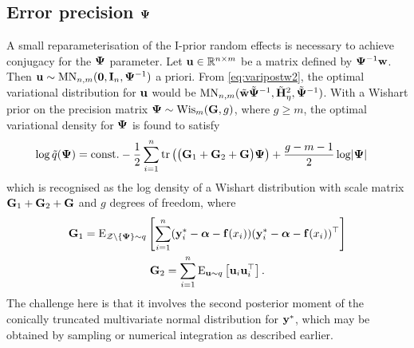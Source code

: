 
\subsection[Error precision Psi]{Error precision ${\bm\Psi}$}

A small reparameterisation of the I-prior random effects is necessary to achieve conjugacy for the ${\bm\Psi}$ parameter. 
Let ${\mathbf u}\in\mathbb{R}^{n\times m}$ be a matrix defined by ${\bm\Psi}^{-1}{\mathbf w}$.
Then ${\mathbf u} \sim \operatorname{MN}_{n,m}({\mathbf 0}, {\mathbf I}_n, {\bm\Psi}^{-1})$ a priori.
From \cref{eq:varipostw2}, the optimal variational distribution for ${\mathbf u}$ would be $\operatorname{MN}_{n,m}(\tilde{{\mathbf w}}\tilde{{\bm\Psi}}^{-1}, \tilde{{\mathbf H}}_\eta^2, \tilde{{\bm\Psi}}^{-1})$.
With a Wishart prior on the precision matrix ${\bm\Psi}\sim\operatorname{Wis}_m({\mathbf G},g)$, where $g\geq m$, the optimal variational density for ${\bm\Psi}$ is found to satisfy
\begin{align*}
  \log \tilde q({\bm\Psi})
  &= \text{const.}\hspace{0.01em} - \frac{1}{2} \sum_{i=1}^n \operatorname{tr} \left( 
  \big({\mathbf G}_1 + {\mathbf G}_2 + {\mathbf G} \big){\bm\Psi} 
  \right) + \frac{g-m-1}{2} \log \lvert{\bm\Psi}\rvert
\end{align*}
which is recognised as the log density of a Wishart distribution with scale matrix ${\mathbf G}_1 + {\mathbf G}_2 + {\mathbf G}$ and $g$ degrees of freedom, where
\begin{align}
  \begin{gathered}
  {\mathbf G}_1 = \operatorname{E}_{{\mathcal Z}\backslash\{{\bm\Psi}\}\sim q} \left[ 
  \sum_{i=1}^n 
  ({\mathbf y}^*_i - {\bm\alpha} - {\mathbf f}(x_i))
  ({\mathbf y}^*_i - {\bm\alpha} - {\mathbf f}(x_i))^\top 
  \right]   \\
  {\mathbf G}_2 = \sum_{i=1}^n \operatorname{E}_{{\mathbf u}\sim q}\left[{\mathbf u}_i{\mathbf u}_i^\top \right].
  \end{gathered}
\end{align}
The challenge here is that it involves the second posterior moment of the conically truncated multivariate normal distribution for ${\mathbf y}^*$, which may be obtained by sampling or numerical integration as described earlier.

